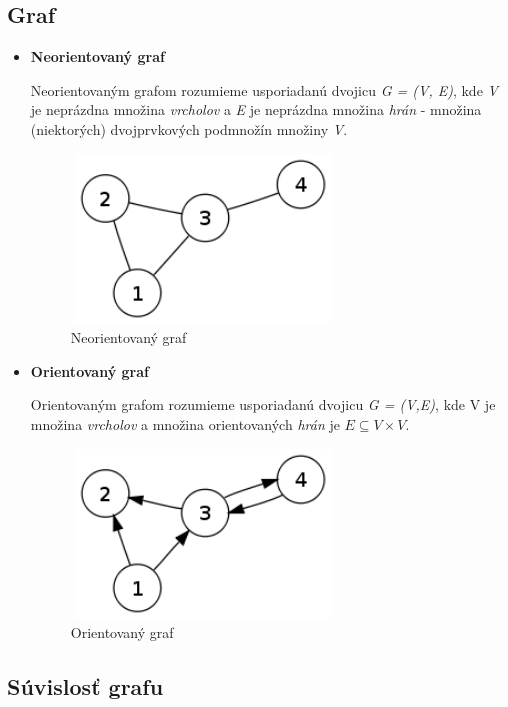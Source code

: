 \documentclass[slovak,master,public,dept460,male,cpdeclaration,oneside]{diploma}
\begin{document}
\subsection{Graf}
\begin{itemize}

\item \textbf{Neorientovaný graf}

Neorientovaným grafom rozumieme usporiadanú dvojicu \textit{G = (V, E)}, kde \textit{V} je neprázdna množina \textit{vrcholov} a \textit{E} je neprázdna množina \textit{hrán} - množina (niektorých) dvojprvkových podmnožín množiny \textit{V}.

\begin{figure}[H]
\centering
\includegraphics[width=7cm,height=4.5cm]{figures/neorientovany}
\caption{Neorientovaný graf}
\end{figure}

\item \textbf{Orientovaný graf}

Orientovaným grafom rozumieme usporiadanú dvojicu \textit{G = (V,E)}, kde V je množina \textit{vrcholov} a množina orientovaných \textit{hrán} je $E \subseteq  V \times V$. 

\begin{figure}[H]
\centering
\includegraphics[width=7cm,height=4.5cm]{figures/orientovany}
\caption{Orientovaný graf}
\end{figure}

\end{itemize}
\newpage
\subsection{Súvislosť grafu}
\end{document}
